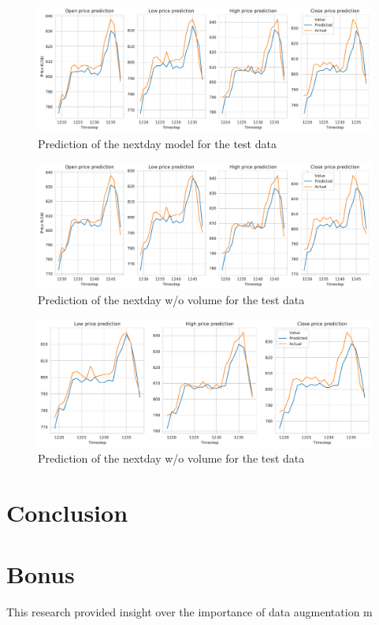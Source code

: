 \documentclass[10pt,twocolumn,letterpaper]{article}
\begin{document}
\begin{figure}[h]
	\begin{center}
		\includegraphics[width=0.9\linewidth]{prediction_nextday.pdf}
		\caption{Prediction of the nextday model for the test data}
		\label{fig:nextday_pred}
	\end{center}
\end{figure}

\begin{figure}[h]
	\begin{center}
		\includegraphics[width=0.9\linewidth]{prediction_nextday_novolume.pdf}
		\caption{Prediction of the nextday w/o volume for the test data}
		\label{fig:nextday_novolume_pred}
	\end{center}
\end{figure}

\begin{figure}[h]
	\begin{center}
		\includegraphics[width=0.9\linewidth]{prediction_intraday.pdf}
		\caption{Prediction of the nextday w/o volume for the test data}
		\label{fig:intraday_pred}
	\end{center}
\end{figure}



\section{Conclusion}



\section{Bonus}

This research provided insight over the importance of data augmentation m

{\small


}
\end{document}
